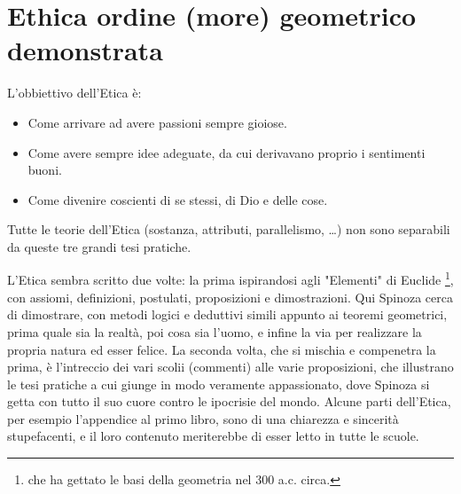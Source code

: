 \chapter{Ethica ordine (more) geometrico demonstrata}
L'obbiettivo dell'Etica è:\begin{itemize}
	\item Come arrivare ad avere passioni sempre gioiose.
	\item Come avere sempre idee adeguate, da cui derivavano proprio i sentimenti buoni.
	\item Come divenire coscienti di se stessi, di Dio e delle cose.
\end{itemize}
Tutte le teorie dell'Etica (sostanza, attributi, parallelismo, \dots) non sono separabili da queste tre grandi tesi pratiche.

L'Etica sembra scritto due volte: la prima ispirandosi agli "Elementi" di Euclide \footnote{che ha gettato le basi della geometria nel 300 a.c. circa.}, con assiomi, definizioni, postulati, proposizioni e dimostrazioni. Qui Spinoza cerca di dimostrare, con metodi logici e deduttivi simili appunto ai teoremi geometrici, prima quale sia la realtà, poi cosa sia l'uomo, e infine la via per realizzare la propria natura ed esser felice. La seconda volta, che si mischia e compenetra la prima, è l'intreccio dei vari scolii (commenti) alle varie proposizioni, che illustrano le tesi pratiche a cui giunge in modo veramente appassionato, dove Spinoza si getta con tutto il suo cuore contro le ipocrisie del mondo. Alcune parti dell'Etica, per esempio l'appendice al primo libro, sono di una chiarezza e sincerità stupefacenti, e il loro contenuto meriterebbe di esser letto in tutte le scuole.
